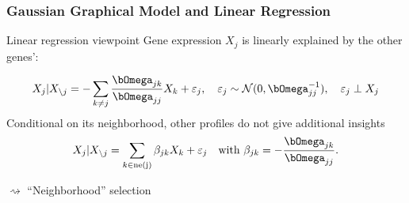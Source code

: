 \begin{frame}
  \frametitle{Gaussian Graphical Model and Linear Regression}

  \begin{block}{Linear regression viewpoint}
    Gene expression $X_j$ is linearly explained by the other genes':

    \begin{equation*}
      X_j | X_{ \setminus j} = - \sum_{k \neq j}
      \frac{\invcov_{jk}}{\invcov_{jj}} X_{k} + \varepsilon_j,\quad \varepsilon_j
      \sim \mathcal{N}(0,\invcov_{jj}^{-1}), \quad \varepsilon_j \perp X_j
      \end{equation*}
      Conditional  on its  neighborhood,  other profiles  do not  give additional insights
    \begin{equation*}
      X_j | X_{ \setminus j} =
       \sum_{k \in \text{ne(j)}} \beta_{jk} X_k + \varepsilon_j
      \quad         \text{with         }         \beta_{jk}         =
      -\frac{\invcov_{jk}}{\invcov_{jj}}.
    \end{equation*}
  \end{block}


  \vfill
  \alert{$\rightsquigarrow$ ``Neighborhood'' selection}

\end{frame}

